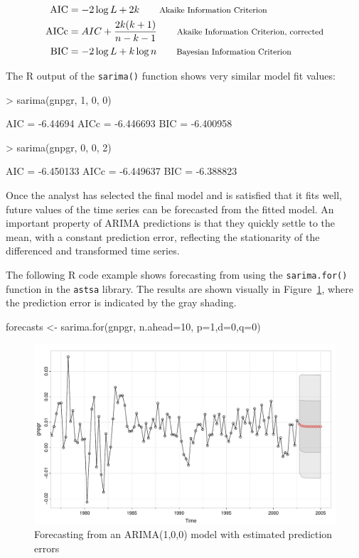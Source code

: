 \begin{align*}
\operatorname{AIC} &= -2 \log L + 2k  \qquad \text{\footnotesize Akaike Information Criterion}\\
\operatorname{AICc} &= AIC + \frac{2k(k+1)}{n-k-1} \qquad \text{\footnotesize Akaike Information Criterion, corrected}\\
\operatorname{BIC} &= -2 \log L + k \log n \qquad \text{\footnotesize Bayesian Information Criterion}
\end{align*}

\noindent The R output of the \texttt{sarima()} function shows very similar model fit values:

\begin{samepage}
\begin{textcode}
> sarima(gnpgr, 1, 0, 0)

AIC = -6.44694  AICc = -6.446693  BIC = -6.400958 
\end{textcode}
\end{samepage}

\begin{samepage}
\begin{textcode}
> sarima(gnpgr, 0, 0, 2)

AIC = -6.450133  AICc = -6.449637  BIC = -6.388823 
\end{textcode}
\end{samepage}

Once the analyst has selected the final model and is satisfied that it fits well, future values of the time series can be forecasted from the fitted model. An important property of ARIMA predictions is that they quickly settle to the mean, with a constant prediction error, reflecting the stationarity of the differenced and transformed time series.

The following R code example shows forecasting from using the \texttt{sarima.for()} function in the \texttt{astsa} library. The results are shown visually in Figure~\ref{fig:figure21}, where the prediction error is indicated by the gray shading.

\begin{Rcode}
forecasts <- sarima.for(gnpgr, n.ahead=10, p=1,d=0,q=0)
\end{Rcode}

\begin{figure}
\centering
\includegraphics[width=.75\textwidth]{figure21.pdf}
\caption[Forecasting from an ARIMA(1,0,0) model]{Forecasting from an ARIMA(1,0,0) model with estimated prediction errors}
\label{fig:figure21}
\end{figure}

